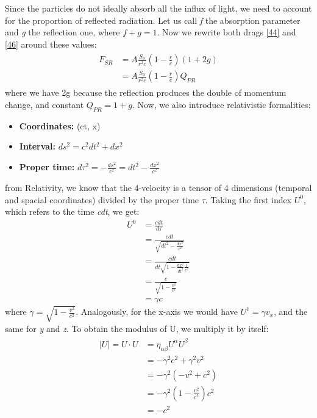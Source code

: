 \documentclass[12pt,a4paper]{article}
\begin{document}
Since the particles do not ideally absorb all the influx of light, we need to account for the proportion of reflected radiation. Let us call \textit{f} the absorption parameter and \textit{g} the reflection one, where $f+g=1$. Now we rewrite both drags \eqref{44} and \eqref{46} around these values:
\begin{align}
    \begin{split}
        F_{SR}&=A\frac{S_0}{r^2c}(1-\frac{\dot{r}}{c})(1+2g) \\
        &=A\frac{S_0}{r^2c}(1-\frac{\dot{r}}{c})Q_{PR}
    \end{split}
\end{align}
where we have 2g because the reflection produces the double of momentum change, and constant $Q_{PR}=1+g$. Now, we also introduce relativistic formalities:
\begin{itemize}
    \item \textbf{Coordinates:} (ct, x)
    \item \textbf{Interval:} $ds^2=c^2dt^2+dx^2$
    \item \textbf{Proper time:} $d\tau^2=-\frac{ds^2}{c^2}=dt^2-\frac{dx^2}{c^2}$
\end{itemize}
from Relativity, we know that the 4-velocity is a tensor of 4 dimensions (temporal and spacial coordinates) divided by the proper time $\tau$. Taking the first index $U^0$, which refers to the time \textit{cdt}, we get:
\begin{align*}
    U^0&=\frac{cdt}{d\tau} \\
    &=\frac{cdt}{\sqrt{dt^2-\frac{dx^2}{c^2}}} \\
    &=\frac{cdt}{dt\sqrt{1-\frac{dx^2}{dt^2}\frac{1}{c^2}}} \\
    &=\frac{c}{\sqrt{1-\frac{v^2}{c^2}}} \\
    &=\gamma c
\end{align*}
where $\gamma=\sqrt{1-\frac{v^2}{c^2}}$. Analogously, for the x-axis we would have $U^1=\gamma v_x$, and the same for \textit{y} and \textit{z}. To obtain the modulus of U, we multiply it by itself:
\begin{align}
\begin{split}
    |U|=U\cdot U&=\eta_{\alpha\beta}U^\alpha U^\beta \\
    &=-\gamma^2c^2+\gamma^2v^2 \\
    &=-\gamma^2(-v^2+c^2) \\
    &=-\gamma^2(1-\frac{v^2}{c^2})c^2 \\
    &=-c^2
\end{split}
\end{align}
\end{document}
